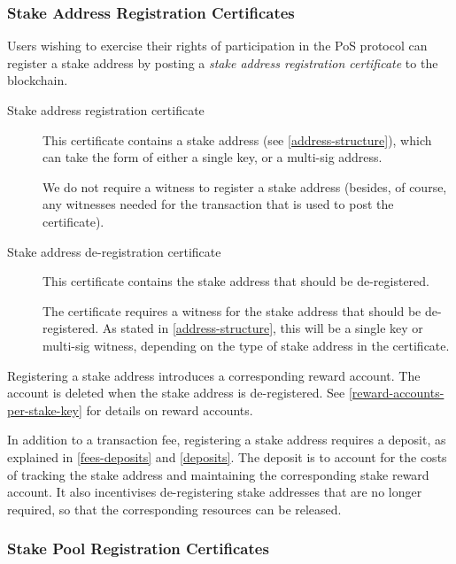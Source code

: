 \documentclass[11pt,a4paper]{article}
\begin{document}
\subsubsection{Stake Address Registration Certificates}
\label{stake-address-registration-certificates}

Users wishing to exercise their rights of participation in the PoS protocol can
register a stake address by posting a \emph{stake address registration
  certificate} to the blockchain.

\begin{description}
\item[Stake address registration certificate] This certificate contains a stake
  address (see \cref{address-structure}), which can take the form of either a
  single key, or a multi-sig address.

  We do not require a witness to register a stake address (besides, of course,
  any witnesses needed for the transaction that is used to post the
  certificate).

\item[Stake address de-registration certificate]
This certificate contains the stake address that should be de-registered.

The certificate requires a witness for the stake address that should be
de-registered. As stated in \cref{address-structure}, this will be a single key
or multi-sig witness, depending on the type of stake address in the certificate.

\end{description}

Registering a stake address introduces a corresponding reward account.
The account is deleted when the stake address is de-registered. See
\cref{reward-accounts-per-stake-key} for details on reward accounts.

In addition to a transaction fee, registering a stake address requires a
deposit, as explained in \cref{fees-deposits} and \cref{deposits}. The deposit
is to account for the costs of tracking the stake address and maintaining the
corresponding stake reward account. It also incentivises de-registering stake
addresses that are no longer required, so that the corresponding resources can
be released.

\subsubsection{Stake Pool Registration Certificates}
\label{stake-pool-registration-certificates}
\end{document}

